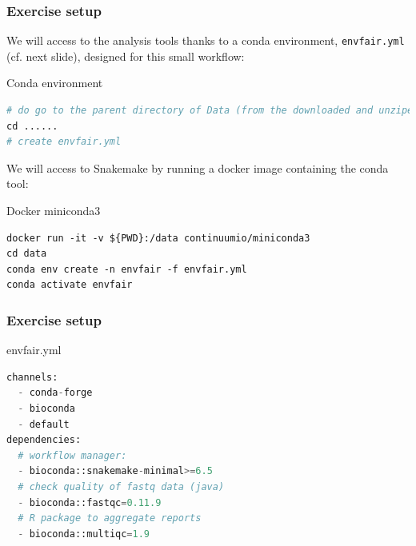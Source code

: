 \begin{frame}[containsverbatim]
\frametitle{Exercise setup}
We will access to the analysis tools thanks to a conda environment, \verb|envfair.yml| (cf. next slide), designed for this small workflow:
\begin{exampleblock}{Conda environment}
\begin{lstlisting}[language=python]
# do go to the parent directory of Data (from the downloaded and unziped data):
cd ......
# create envfair.yml
\end{lstlisting}
\end{exampleblock}
We will access to Snakemake by running a docker image containing the conda tool:
\begin{exampleblock}{Docker miniconda3}
\begin{lstlisting}
docker run -it -v ${PWD}:/data continuumio/miniconda3
cd data
conda env create -n envfair -f envfair.yml
conda activate envfair
\end{lstlisting}
\end{exampleblock}
\end{frame}
\begin{frame}[containsverbatim]
\frametitle{Exercise setup}
\begin{exampleblock}{envfair.yml}
\begin{lstlisting}[language=python]
channels:
  - conda-forge
  - bioconda
  - default
dependencies:
  # workflow manager:
  - bioconda::snakemake-minimal>=6.5 
  # check quality of fastq data (java)
  - bioconda::fastqc=0.11.9 
  # R package to aggregate reports
  - bioconda::multiqc=1.9 
\end{lstlisting}
\end{exampleblock}
\end{frame}
